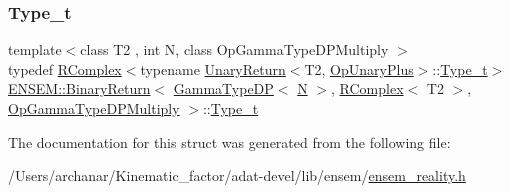 \subsubsection{\texorpdfstring{Type\_t}{Type\_t}\hspace{0.1cm}{\footnotesize\ttfamily [3/3]}}
{\footnotesize\ttfamily template$<$class T2 , int N, class Op\+Gamma\+Type\+D\+P\+Multiply $>$ \\
typedef \mbox{\hyperlink{classENSEM_1_1RComplex}{R\+Complex}}$<$typename \mbox{\hyperlink{structENSEM_1_1UnaryReturn}{Unary\+Return}}$<$T2, \mbox{\hyperlink{structENSEM_1_1OpUnaryPlus}{Op\+Unary\+Plus}}$>$\+::\mbox{\hyperlink{structENSEM_1_1BinaryReturn_3_01GammaTypeDP_3_01N_01_4_00_01RComplex_3_01T2_01_4_00_01OpGammaTypeDPMultiply_01_4_a7e6760cdc5301aa79d46345dc1f653fe}{Type\+\_\+t}}$>$ \mbox{\hyperlink{structENSEM_1_1BinaryReturn}{E\+N\+S\+E\+M\+::\+Binary\+Return}}$<$ \mbox{\hyperlink{classENSEM_1_1GammaTypeDP}{Gamma\+Type\+DP}}$<$ \mbox{\hyperlink{adat__devel_2lib_2hadron_2operator__name__util_8cc_a7722c8ecbb62d99aee7ce68b1752f337}{N}} $>$, \mbox{\hyperlink{classENSEM_1_1RComplex}{R\+Complex}}$<$ T2 $>$, \mbox{\hyperlink{structENSEM_1_1OpGammaTypeDPMultiply}{Op\+Gamma\+Type\+D\+P\+Multiply}} $>$\+::\mbox{\hyperlink{structENSEM_1_1BinaryReturn_3_01GammaTypeDP_3_01N_01_4_00_01RComplex_3_01T2_01_4_00_01OpGammaTypeDPMultiply_01_4_a7e6760cdc5301aa79d46345dc1f653fe}{Type\+\_\+t}}}



The documentation for this struct was generated from the following file\+:\begin{DoxyCompactItemize}
\item 
/\+Users/archanar/\+Kinematic\+\_\+factor/adat-\/devel/lib/ensem/\mbox{\hyperlink{adat-devel_2lib_2ensem_2ensem__reality_8h}{ensem\+\_\+reality.\+h}}\end{DoxyCompactItemize}
